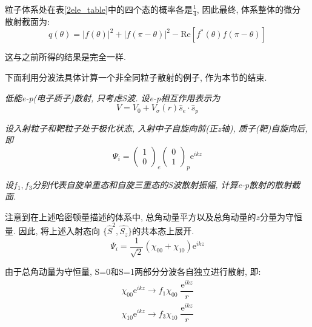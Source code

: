 \documentclass[a4paper, 11pt]{article}
\begin{document}
\begin{spacing}{1.2}
          粒子体系处在表\ref{2ele_table}中的四个态的概率各是$\frac{1}{4}$, 因此最终, 体系整体的微分
          散射截面为: 
          \begin{equation*}
            q(\theta) = |f(\theta)|^2 + |f(\pi-\theta)|^2 - \mathrm{Re}[f^*(\theta)f(\pi-\theta)]
          \end{equation*}

          这与之前所得的结果是完全一样. 

          下面利用分波法具体计算一个非全同粒子散射的例子, 作为本节的结束.

          \emph{低能e-p(电子质子)散射, 只考虑S波. 设e-p相互作用表示为}
          \begin{equation}
            V = V_0 + V_{\sigma}(r)\hat{s}_e\cdot\hat{s}_p
          \end{equation}

          \emph{设入射粒子和靶粒子处于极化状态, 入射中子自旋向前(正z轴), 质子(靶)自旋向后, 即}
          \begin{equation}
            \Psi_i = \left(\begin{array}{c}1\\0\end{array}\right)_e%
                     \left(\begin{array}{c}0\\1\end{array}\right)_p%
                      \mathrm{e}^{ikz}
          \end{equation}

          \emph{设$f_1, f_3$分别代表自旋单重态和自旋三重态的S波散射振幅, 计算e-p散射的散射截面.}

          注意到在上述哈密顿量描述的体系中, 总角动量平方以及总角动量的$z$分量为守恒量. 因此, 将上述入射态向
          $\{\hat{S}^2, \hat{S_z}\}$的共本态上展开. 
          \begin{equation}
            \Psi_i = \dfrac{1}{\sqrt{2}}\left(\chi_{00}+\chi_{10}\right)\mathrm{e}^{ikz}
          \end{equation}

          由于总角动量为守恒量, S=0和S=1两部分分波各自独立进行散射, 即:
          \begin{equation}
            \begin{aligned}
              \chi_{00}\mathrm{e}^{ikz} \longrightarrow f_1\chi_{00}\;\dfrac{\mathrm{e}^{ikz}}{r}\\
              \chi_{10}\mathrm{e}^{ikz} \longrightarrow f_3\chi_{10}\;\dfrac{\mathrm{e}^{ikz}}{r}
            \end{aligned}
          \end{equation}


\end{spacing}
\end{document}
